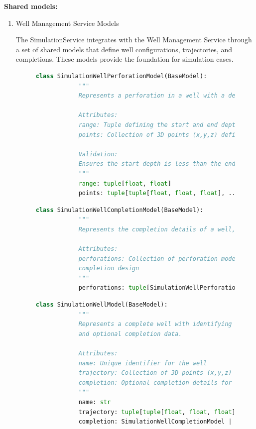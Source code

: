 \textbf{Shared models:}
\begin{enumerate}
	\item Well Management Service Models

	The SimulationService integrates with the Well Management Service through a set of shared models that define well configurations, trajectories, and completions. These models provide the foundation for simulation cases.

	\begin{figure}[H]
		\begin{lstlisting}[language=Python, caption={SimulationWellPerforation Model}]
			class SimulationWellPerforationModel(BaseModel):
			"""
			Represents a perforation in a well with a depth range and 3D coordinate points.

			Attributes:
			range: Tuple defining the start and end depths of the perforation
			points: Collection of 3D points (x,y,z) defining the perforation geometry

			Validation:
			Ensures the start depth is less than the end depth
			"""
			range: tuple[float, float]
			points: tuple[tuple[float, float, float], ...]
		\end{lstlisting}
	\end{figure}

	\begin{figure}[H]
		\begin{lstlisting}[language=Python, caption={imulationWellCompletio nModel}]
			class SimulationWellCompletionModel(BaseModel):
			"""
			Represents the completion details of a well, containing perforations.

			Attributes:
			perforations: Collection of perforation models defining the well's
			completion design
			"""
			perforations: tuple[SimulationWellPerforationModel, ...]
		\end{lstlisting}
	\end{figure}

	\begin{figure}[H]
		\begin{lstlisting}[language=Python, caption={SimulationWell Model}]
			class SimulationWellModel(BaseModel):
			"""
			Represents a complete well with identifying information, trajectory,
			and optional completion data.

			Attributes:
			name: Unique identifier for the well
			trajectory: Collection of 3D points (x,y,z) defining the well path
			completion: Optional completion details for the well
			"""
			name: str
			trajectory: tuple[tuple[float, float, float], ...]
			completion: SimulationWellCompletionModel | None = Field(default=None)
		\end{lstlisting}
	\end{figure}


\end{enumerate}
